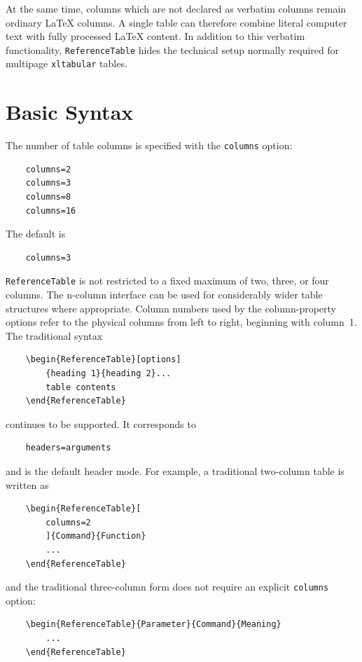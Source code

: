 \documentclass[
11pt,
a4paper,
oneside
]{scrbook}
\begin{document}
{At the same time, columns which are not declared as verbatim columns remain
ordinary \LaTeX{} columns. A single table can therefore combine literal
computer text with fully processed \LaTeX{} content.
In addition to this verbatim functionality, \texttt{ReferenceTable} hides the
technical setup normally required for multipage \texttt{xltabular} tables.

\section{Basic Syntax}

The number of table columns is specified with the \texttt{columns} option:
\begin{verbatim}
	columns=2
	columns=3
	columns=8
	columns=16
\end{verbatim}
The default is
\begin{verbatim}
	columns=3
\end{verbatim}
\texttt{ReferenceTable} is not restricted to a fixed maximum of two, three,
or four columns. The n-column interface can be used for considerably wider
table structures where appropriate.
Column numbers used by the column-property options refer to the physical
columns from left to right, beginning with column~1.
The traditional syntax
\begin{verbatim}
	\begin{ReferenceTable}[options]
		{heading 1}{heading 2}...
		table contents
	\end{ReferenceTable}
\end{verbatim}
continues to be supported. It corresponds to
\begin{verbatim}
	headers=arguments
\end{verbatim}
and is the default header mode.
For example, a traditional two-column table is written as
\begin{verbatim}
	\begin{ReferenceTable}[
		columns=2
		]{Command}{Function}
		...
	\end{ReferenceTable}
\end{verbatim}
and the traditional three-column form does not require an explicit
\texttt{columns} option:
\begin{verbatim}
	\begin{ReferenceTable}{Parameter}{Command}{Meaning}
		...
	\end{ReferenceTable}
\end{verbatim}

}
\end{document}
